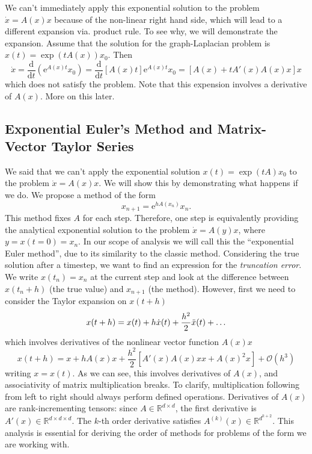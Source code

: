 We can't immediately apply this exponential solution to the problem $\dot{x} = A(x)x$ because of the non-linear right hand side, which will lead to a different expansion via. product rule.
To see why, we will demonstrate the expansion. Assume that the solution for the graph-Laplacian problem is $x(t) = \exp(tA(x))x_0$.
Then
\begin{equation*}
    \dot{x} = \frac{\mathrm{d}}{\mathrm{d}t} \left(
        \mathrm{e}^{A(x)t}x_0 
    \right) = \frac{\mathrm{d}}{\mathrm{d}t} \left[
        A(x)t
    \right] \mathrm{e}^{A(x)t}x_0 = \left[
        A(x) + t A'(x) A(x) x
    \right] x
\end{equation*}
which does not satisfy the problem.
Note that this expension involves a derivative of $A(x)$. More on this later.

\subsection{Exponential Euler's Method and Matrix-Vector Taylor Series}

We said that we can't apply the exponential solution $x(t) = \exp(tA)x_0$ to the problem $\dot{x} = A(x)x$.
We will show this by demonstrating what happens if we do. We propose a method of the form
\begin{equation}
    x_{n+1} = \mathrm{e}^{h A(x_n)}x_n.
\end{equation}
This method fixes $A$ for each step. Therefore, one step is equivalently providing the analytical exponential solution to the problem $\dot{x} = A(y)x$,
where $y = x(t=0) = x_n$.
In our scope of analysis we will call this the ``exponential Euler method'', due to its similarity to the classic method.
Considering the true solution after a timestep, we want to find an expression for the \textit{truncation error}.
We write $x(t_n) = x_n$ at the current step and look at the difference between $x(t_n + h)$ (the true value) and $x_{n+1}$ (the method).
However, first we need to consider the Taylor expansion on $x(t + h)$
\begin{equation*}
    x(t+h) = x(t) + h \dot{x}(t) + \frac{h^2}{2}\ddot{x}(t) + \mathellipsis
\end{equation*}
which involves derivatives of the nonlinear vector function $A(x)x$
\begin{equation*}
    x(t+h) = x + h A(x)x + \frac{h^2}{2} \left[ A'(x)A(x)xx + A(x)^2  x \right] + \mathcal{O}(h^3)
\end{equation*}
writing $x = x(t)$.
As we can see, this involves derivatives of $A(x)$, and associativity of matrix multiplication breaks.
To clarify, multiplication following from left to right should always perform defined operations.
Derivatives of $A(x)$ are rank-incrementing tensors: since $A \in \mathds{R}^{d \times d}$,
the first derivative is $A'(x) \in \mathds{R}^{d \times d \times d}$.
The $k$-th order derivative satisfies $A^{(k)}(x) \in \mathds{R}^{d^{k+2}}$.
This analysis is essential for deriving the order of methods for problems of the form we are working with.

